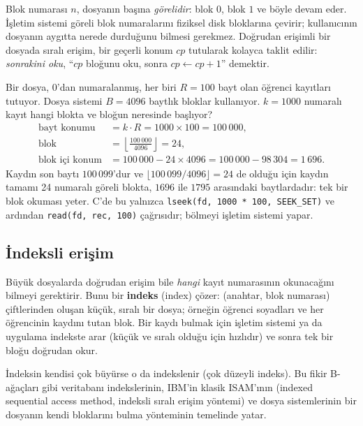 \documentclass[11pt,a4paper]{article}
\newcommand{\term}[1]{\textbf{\color{mintdeep}#1}}
\newcommand{\cmd}[1]{\texttt{#1}}
\begin{document}
Blok numarası $n$, dosyanın başına \emph{görelidir}: blok $0$, blok $1$ ve böyle devam eder. İşletim sistemi göreli blok numaralarını fiziksel disk bloklarına çevirir; kullanıcının dosyanın aygıtta nerede durduğunu bilmesi gerekmez. Doğrudan erişimli bir dosyada sıralı erişim, bir geçerli konum $cp$ tutularak kolayca taklit edilir: \emph{sonrakini oku}, ``$cp$ bloğunu oku, sonra $cp \leftarrow cp+1$'' demektir.

\begin{example}
Bir dosya, $0$'dan numaralanmış, her biri $R = 100$ bayt olan öğrenci kayıtları tutuyor. Dosya sistemi $B = 4096$ baytlık bloklar kullanıyor. $k = 1000$ numaralı kayıt hangi blokta ve bloğun neresinde başlıyor?
\begin{align*}
\text{bayt konumu} &= k \cdot R = 1000 \times 100 = 100\,000,\\
\text{blok} &= \left\lfloor \frac{100\,000}{4096} \right\rfloor = 24,\\
\text{blok içi konum} &= 100\,000 - 24 \times 4096 = 100\,000 - 98\,304 = 1\,696 .
\end{align*}
Kaydın son baytı $100\,099$'dur ve $\lfloor 100\,099 / 4096 \rfloor = 24$ de olduğu için kaydın tamamı 24 numaralı göreli blokta, $1696$ ile $1795$ arasındaki baytlardadır: tek bir blok okuması yeter. C'de bu yalnızca \cmd{lseek(fd, 1000 * 100, SEEK\_SET)} ve ardından \cmd{read(fd, rec, 100)} çağrısıdır; bölmeyi işletim sistemi yapar.
\end{example}

\subsection{İndeksli erişim}

Büyük dosyalarda doğrudan erişim bile \emph{hangi} kayıt numarasının okunacağını bilmeyi gerektirir. Bunu bir \term{indeks} (index) çözer: (anahtar, blok numarası) çiftlerinden oluşan küçük, sıralı bir dosya; örneğin öğrenci soyadları ve her öğrencinin kaydını tutan blok. Bir kaydı bulmak için işletim sistemi ya da uygulama indekste arar (küçük ve sıralı olduğu için hızlıdır) ve sonra tek bir bloğu doğrudan okur.

İndeksin kendisi çok büyürse o da indekslenir (çok düzeyli indeks). Bu fikir B-ağaçları gibi veritabanı indekslerinin, IBM'in klasik ISAM'ının (indexed sequential access method, indeksli sıralı erişim yöntemi) ve dosya sistemlerinin bir dosyanın kendi bloklarını bulma yönteminin temelinde yatar.
\end{document}
